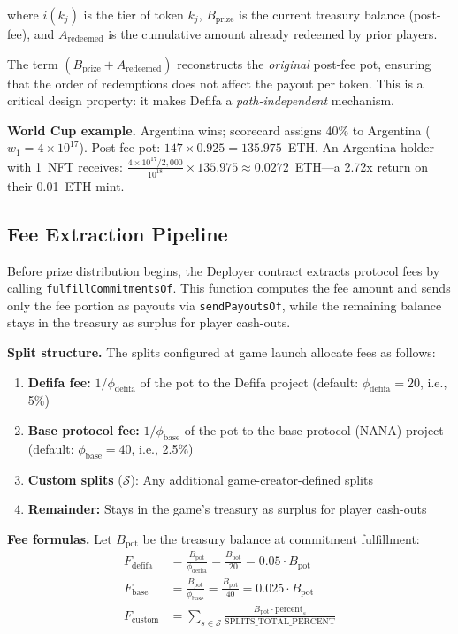 \documentclass[11pt,a4paper]{article}
\begin{document}
where $i(k_j)$ is the tier of token $k_j$, $B_{\text{prize}}$ is the current treasury balance (post-fee), and $A_{\text{redeemed}}$ is the cumulative amount already redeemed by prior players.

The term $(B_{\text{prize}} + A_{\text{redeemed}})$ reconstructs the \emph{original} post-fee pot, ensuring that the order of redemptions does not affect the payout per token. This is a critical design property: it makes Defifa a \emph{path-independent} mechanism.

\textbf{World Cup example.} Argentina wins; scorecard assigns 40\% to Argentina ($w_1 = 4 \times 10^{17}$). Post-fee pot: $147 \times 0.925 = 135.975$~ETH. An Argentina holder with 1~NFT receives: $\frac{4 \times 10^{17} / 2{,}000}{10^{18}} \times 135.975 \approx 0.0272$~ETH---a 2.72x return on their 0.01~ETH mint.

\subsection{Fee Extraction Pipeline}

Before prize distribution begins, the Deployer contract extracts protocol fees by calling \texttt{fulfill\-Commitments\-Of}. This function computes the fee amount and sends only the fee portion as payouts via \texttt{send\-Payouts\-Of}, while the remaining balance stays in the treasury as surplus for player cash-outs.

\textbf{Split structure.} The splits configured at game launch allocate fees as follows:
\begin{enumerate}[nosep]
    \item \textbf{Defifa fee:} $1/\phi_{\text{defifa}}$ of the pot to the Defifa project (default: $\phi_{\text{defifa}} = 20$, i.e., 5\%)
    \item \textbf{Base protocol fee:} $1/\phi_{\text{base}}$ of the pot to the base protocol (NANA) project (default: $\phi_{\text{base}} = 40$, i.e., 2.5\%)
    \item \textbf{Custom splits} ($\mathcal{S}$): Any additional game-creator-defined splits
    \item \textbf{Remainder:} Stays in the game's treasury as surplus for player cash-outs
\end{enumerate}

\textbf{Fee formulas.} Let $B_{\text{pot}}$ be the treasury balance at commitment fulfillment:
\begin{align}
F_{\text{defifa}} &= \frac{B_{\text{pot}}}{\phi_{\text{defifa}}} = \frac{B_{\text{pot}}}{20} = 0.05 \cdot B_{\text{pot}} \\[4pt]
F_{\text{base}} &= \frac{B_{\text{pot}}}{\phi_{\text{base}}} = \frac{B_{\text{pot}}}{40} = 0.025 \cdot B_{\text{pot}} \\[4pt]
F_{\text{custom}} &= \sum_{s \in \mathcal{S}} \frac{B_{\text{pot}} \cdot \text{percent}_s}{\text{SPLITS\_TOTAL\_PERCENT}}
\end{align}
\end{document}
